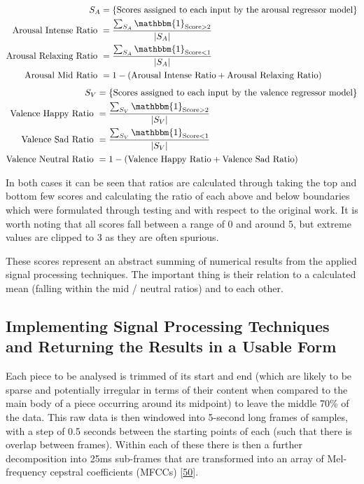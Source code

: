 \documentclass[12pt,]{article}
\begin{document}
\[\begin{aligned}
S_A &= \{\text{Scores assigned to each input by the arousal regressor model}\} \\
\text{Arousal Intense Ratio } &= \frac{\sum_{S_A} \mathbbm{1}_{\text{Score}> 2}}{|S_A|} \\
\text{Arousal Relaxing Ratio } &= \frac{\sum_{S_A} \mathbbm{1}_{\text{Score}< 1}}{|S_A|} \\
\text{Arousal Mid Ratio } &= 1 - (\text{Arousal Intense Ratio} + \text{Arousal Relaxing Ratio})
\end{aligned}\] \[\begin{aligned}
S_V &= \{\text{Scores assigned to each input by the valence regressor model}\} \\
\text{Valence Happy Ratio } &= \frac{\sum_{S_V} \mathbbm{1}_{\text{Score}> 2}}{|S_V|} \\
\text{Valence Sad Ratio } &= \frac{\sum_{S_V} \mathbbm{1}_{\text{Score}< 1}}{|S_V|} \\
\text{Valence Neutral Ratio } &= 1 - (\text{Valence Happy Ratio} + \text{Valence Sad Ratio}) \\
\end{aligned}\]

In both cases it can be seen that ratios are calculated through taking
the top and bottom few scores and calculating the ratio of each above
and below boundaries which were formulated through testing and with
respect to the original work. It is worth noting that all scores fall
between a range of 0 and around 5, but extreme values are clipped to 3
as they are often spurious.

These scores represent an abstract summing of numerical results from the
applied signal processing techniques. The important thing is their
relation to a calculated mean (falling within the mid / neutral ratios)
and to each other.

\hypertarget{implementing-signal-processing-techniques-and-returning-the-results-in-a-usable-form}{%
\subsection{Implementing Signal Processing Techniques and Returning the
Results in a Usable
Form}\label{implementing-signal-processing-techniques-and-returning-the-results-in-a-usable-form}}

Each piece to be analysed is trimmed of its start and end (which are
likely to be sparse and potentially irregular in terms of their content
when compared to the main body of a piece occurring around its midpoint)
to leave the middle 70\% of the data. This raw data is then windowed
into 5-second long frames of samples, with a step of 0.5 seconds between
the starting points of each (such that there is overlap between frames).
Within each of these there is then a further decomposition into 25ms
sub-frames that are transformed into an array of Mel-frequency cepstral
coefficients (MFCCs) {[}\protect\hyperlink{ref-logan2000mel}{50}{]}.
\end{document}
